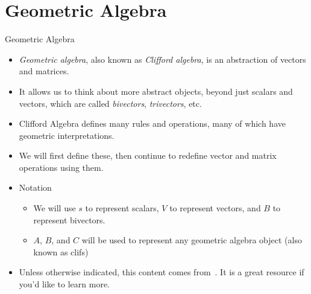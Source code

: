 \documentclass[aspectratio=169,xcolor=dvipsnames]{beamer}
\begin{document}


\section{Geometric Algebra}



\begin{frame}{Geometric Algebra}
\begin{itemize}
      \item \textit{Geometric algebra}, also known as \textit{Clifford algebra},
            is an abstraction of vectors and matrices.
      \item It allows us to think about more abstract objects, beyond just
            scalars and vectors, which are called \textit{bivectors}, 
            \textit{trivectors}, etc.
      \item Clifford Algebra defines many rules and operations, many of which have
            geometric interpretations.
      \item We will first define these, then continue to redefine vector and matrix
            operations using them.
      \item Notation
            \begin{itemize}
                  \item We will use $s$ to represent scalars, $V$ to represent vectors,
                        and $B$ to represent bivectors.
                  \item $A$, $B$, and $C$ will be used to represent any geometric algebra 
                        object (also known as clifs)
            \end{itemize}
      \item Unless otherwise indicated, this content comes from~\cite{henle2025clifford}.
            It is a great resource if you'd like to learn more.
\end{itemize}

\end{frame}
\end{document}
